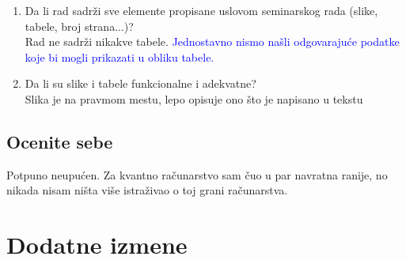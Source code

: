 \documentclass[a4paper]{report}
\newcommand{\odgovor}[1]{\textcolor{blue}{#1}}
\begin{document}
\begin{enumerate}
\item Da li rad sadrži sve elemente propisane uslovom seminarskog rada (slike, tabele, broj strana...)?\\
Rad ne sadrži nikakve tabele.
\odgovor { Jednostavno nismo našli odgovarajuće podatke koje bi mogli prikazati u obliku tabele.}

\item Da li su slike i tabele funkcionalne i adekvatne?\\
Slika je na pravmom mestu, lepo opisuje ono što je napisano u tekstu
\end{enumerate}

\section{Ocenite sebe}
Potpuno neupućen. Za kvantno računarstvo sam čuo u par navratna ranije, no nikada nisam ništa više istraživao o toj grani računarstva.


\chapter{Dodatne izmene}
\end{document}
